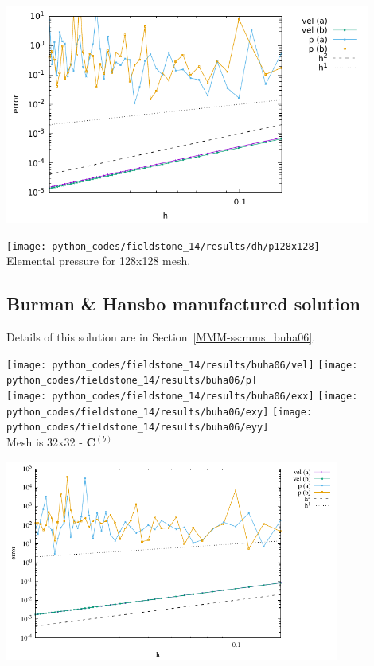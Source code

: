 \begin{center}
\includegraphics[width=12cm]{python_codes/fieldstone_14/results/dh/errors.pdf}
\end{center}


\begin{center}
\texttt{[image: python\_codes/fieldstone\_14/results/dh/p128x128]}\\
{\captionfont Elemental pressure for 128x128 mesh.}
\end{center}

\newpage
\subsection*{Burman \& Hansbo manufactured solution}

Details of this solution are in Section~\ref{MMM-ss:mms_buha06}.


\begin{center}
\texttt{[image: python\_codes/fieldstone\_14/results/buha06/vel]}
\texttt{[image: python\_codes/fieldstone\_14/results/buha06/p]}\\
\texttt{[image: python\_codes/fieldstone\_14/results/buha06/exx]}
\texttt{[image: python\_codes/fieldstone\_14/results/buha06/exy]}
\texttt{[image: python\_codes/fieldstone\_14/results/buha06/eyy]}\\
{\captionfont Mesh is 32x32 - ${\bm C}^{(b)}$}
\end{center}


\begin{center}
\includegraphics[width=11cm]{python_codes/fieldstone_14/results/buha06/errors.pdf}
\end{center}

